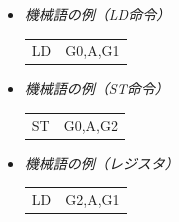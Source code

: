 \documentclass{beamer}                 %
\begin{document}
\begin{frame}
  \begin{itemize}
  \item \emph{機械語の例（LD命令）} \\
    {\ttfamily\vspace{-0.7cm}\begin{center}
      \begin{tabular}{l l}
        LD & G0,A,G1 \\
      \end{tabular}
    \end{center}}
    \vfill
  \item \emph{機械語の例（ST命令）} \\
    {\ttfamily\vspace{-0.7cm}\begin{center}
      \begin{tabular}{l l}
        ST & G0,A,G2 \\
      \end{tabular}
    \end{center}}
    \vfill
  \item \emph{機械語の例（レジスタ）} \\
    {\ttfamily\vspace{-0.7cm}\begin{center}
      \begin{tabular}{l l}
        LD & G2,A,G1 \\
      \end{tabular}
    \end{center}}
  \vfill
  \end{itemize}
  \vfill
  \vfill
\end{frame}
\end{document}
